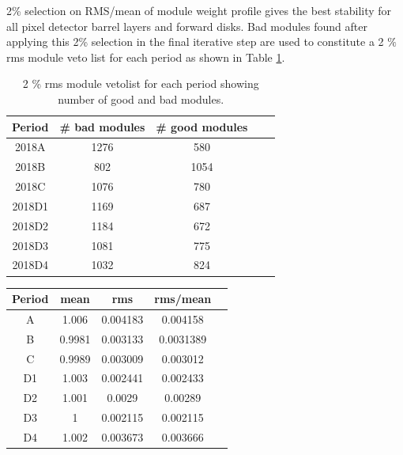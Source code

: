  2\% selection on RMS/mean of module weight profile gives the best stability for all pixel detector barrel layers and forward disks. Bad modules found after applying this 2\% selection in the final iterative step are used to constitute a 2 $\%$ rms module veto list for each period as shown in Table \ref{tab:per period veto}. 
                                                                                 
\begin{table}
  \begin{center}
    \begin{tabular}{ccccc}  
    \textbf{Period}   & \textbf{\# bad modules} & \textbf{\# good modules} \\ \hline
     2018A      &   1276   &  580    \\  
     2018B      &    802  &     1054  \\ 
     2018C      &   1076  &    780   \\ 
     2018D1     &  1169  &     687  \\ 
     2018D2     &  1184  &    672   \\ 
     2018D3     &  1081  &    775   \\ 
     2018D4     &  1032  &     824  \\ 
      \end{tabular}
    \caption[Module veto list for each period]{2 \% rms module vetolist for each period showing number of good and bad modules.}
    \label{tab:per period veto}
  \end{center}
\end{table}


\begin{table}[!ht]
\centering
{}
\begin{tabular}{ccccc}
    \textbf{Period} & \textbf{mean} & \textbf{rms} &  \textbf{rms/mean} \\ \hline
    A & 1.006 & 0.004183 & 0.004158 \\
    B & 0.9981  & 0.003133 & 0.0031389 \\
    C & 0.9989  & 0.003009 & 0.003012\\
    D1 & 1.003  & 0.002441 & 0.002433 \\
    D2 & 1.001  & 0.0029 & 0.00289 \\
   D3  & 1  & 0.002115 & 0.002115 \\
   D4  & 1.002  & 0.003673 & 0.003666 \\ 
\end{tabular}
\label{tab:pccvis_diffveto}
\end{table}






